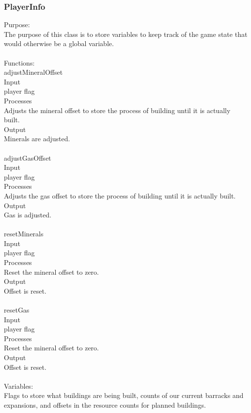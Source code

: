 \documentclass[10pt,letterpaper,onecolumn,draftclsnofoot]{IEEEtran}
\begin{document}
\subsubsection{PlayerInfo}
Purpose:\\
The purpose of this class is to store variables to keep track of the game state that would otherwise be a global variable.\\
\\
Functions:\\
adjustMineralOffset\\
Input\\
player flag\\
Processes\\
Adjusts the mineral offset to store the process of building until it is actually built.\\
Output\\
Minerals are adjusted.\\
\\
adjustGasOffset\\
Input\\
player flag\\
Processes\\
Adjusts the gas offset to store the process of building until it is actually built.\\
Output\\
Gas is adjusted.\\
\\
resetMinerals\\
Input\\
player flag\\
Processes\\
Reset the mineral offset to zero.\\
Output\\
Offset is reset.\\
\\
resetGas\\
Input\\
player flag\\
Processes\\
Reset the mineral offset to zero.\\
Output\\
Offset is reset.\\
\\
Variables:\\
Flags to store what buildings are being built, counts of our current barracks and expansions, and offsets in the resource counts for planned buildings.\\
\end{document}
